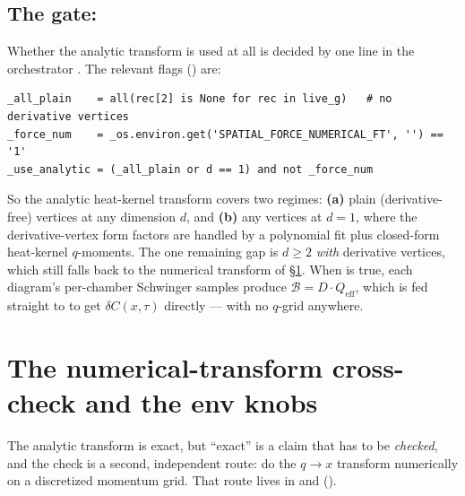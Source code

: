 \subsection{The gate: }

Whether the analytic transform is used at all is decided by one line in the
orchestrator . The relevant flags
() are:

\begin{lstlisting}[style=console]
_all_plain    = all(rec[2] is None for rec in live_g)   # no derivative vertices
_force_num    = _os.environ.get('SPATIAL_FORCE_NUMERICAL_FT', '') == '1'
_use_analytic = (_all_plain or d == 1) and not _force_num
\end{lstlisting}

So the analytic heat-kernel transform covers two regimes: \textbf{(a)} plain
(derivative-free) vertices at any dimension $d$, and \textbf{(b)} any vertices at
$d=1$, where the derivative-vertex form factors are handled by a polynomial fit
plus closed-form heat-kernel $q$-moments. The one remaining gap is $d\ge 2$
\emph{with} derivative vertices, which still falls back to the numerical
transform of \S\ref{sec:hk-numerical}. When  is true, each
diagram's per-chamber Schwinger samples produce $\mathcal{B}=D\cdot Q_{\text{eff}}$,
which is fed straight to  to get $\delta C(x,\tau)$
directly --- with no $q$-grid anywhere.

\section{The numerical-transform cross-check and the env knobs}\label{sec:hk-numerical}

The analytic transform is exact, but ``exact'' is a claim that has to be
\emph{checked}, and the check is a second, independent route: do the $q\to x$
transform numerically on a discretized momentum grid. That route lives in
 and 
().

